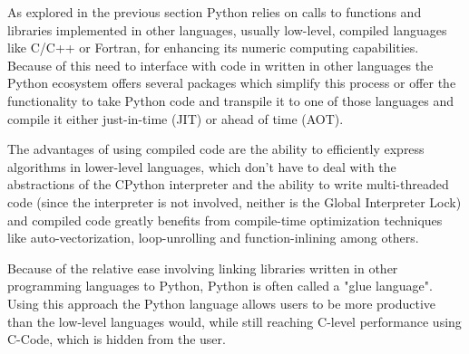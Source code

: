 \documentclass[english,11pt,a4paper,table]{article} %
\begin{document}
As explored in the previous section Python relies on calls to functions and libraries implemented in other languages, usually low-level, compiled languages like C/C++ or Fortran, for enhancing its numeric computing capabilities.
Because of this need to interface with code in written in other languages the Python ecosystem offers several packages which simplify this process or offer the functionality to take Python code and transpile it to one of those languages and compile it either just-in-time (JIT) or ahead of time (AOT).

The advantages of using compiled code are the ability to efficiently express algorithms in lower-level languages, which don't have to deal with the abstractions of the CPython interpreter and the ability to write multi-threaded code (since the interpreter is not involved, neither is the Global Interpreter Lock) and compiled code greatly benefits from compile-time optimization techniques like auto-vectorization, loop-unrolling and function-inlining among others.

Because of the relative ease involving linking libraries written in other programming languages to Python, Python is often called a "glue language".
Using this approach the Python language allows users to be more productive than the low-level languages would, while still reaching C-level performance using C-Code, which is hidden from the user.
\end{document}
